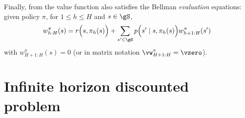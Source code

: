 

Finally, from \cite[Chapter~4]{puterman2014markov} the value function also satisfies the Bellman \emph{evaluation} equations: given policy $\pi$, for $1\le h\le H$ and $s\in\gS$,
\begin{equation}
    \label{eq:finite_be_eval}
    w_{h:H}^\pi(s) = \displaystyle r\Big(s, \pi_h(s)\Big) +\sum_{s'\in\gS}p\Bigl(s' \mid s, \pi_h(s)\Bigr)w_{h+1:H}^\pi(s')
\end{equation}
with $w_{H+1:H}^\pi(s)=0$ (or in matrix notation $\vw_{H+1:H}^\pi=\vzero$).
%

\section{Infinite horizon discounted problem}
\label{ch:mdp:sec:discounted}

